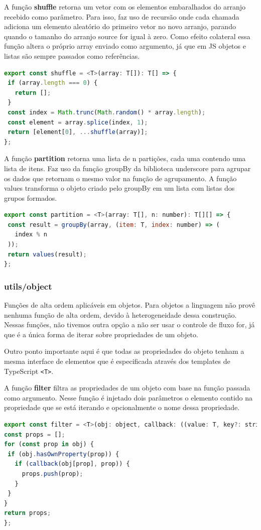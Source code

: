 \documentclass[rel_mlp]{iiufrgs}
\begin{document}
A função \textbf{shuffle} retorna um vetor com os elementos embaralhados do arranjo recebido como parâmetro. Para isso, faz uso de recursão onde cada chamada adiciona um elemento aleatório do primeiro vetor no novo arranjo, parando quando o tamanho do arranjo source for igual à zero. Como efeito colateral essa função altera o próprio array enviado como argumento, já que em JS objetos e listas são sempre passados como referências.
\begin{lstlisting}[language = JavaScript]
export const shuffle = <T>(array: T[]): T[] => {
 if (array.length === 0) {
   return [];
 }
 const index = Math.trunc(Math.random() * array.length);
 const element = array.splice(index, 1);
 return [element[0], ...shuffle(array)];
};
\end{lstlisting}

A função \textbf{partition} retorna uma lista de n partições, cada uma contendo uma lista de itens. Faz uso da função groupBy da biblioteca underscore para agrupar os dados que retornam o mesmo valor na função de agrupamento. A função values transforma o objeto criado pelo groupBy em um lista com listas dos grupos formados.
\begin{lstlisting}[language = JavaScript]
export const partition = <T>(array: T[], n: number): T[][] => {
 const result = groupBy(array, (item: T, index: number) => (
   index % n
 ));
 return values(result);
};
\end{lstlisting}

\subsubsection{utils/object}
Funções de alta ordem aplicáveis em objetos. Para objetos a linguagem não provê nenhuma função de alta ordem, devido à heterogeneidade dessa construção. Nessas funções, não tivemos outra opção a não ser usar o controle de fluxo for, já que é a única forma de iterar sobre propriedades de um objeto. \par Outro ponto importante aqui é que todas as propriedades do objeto tenham a mesma interface de elementos que é especificada através dos templates de TypeScript \verb|<T>|.

A função \textbf{filter} filtra as propriedades de um objeto com base na função passada como argumento. Nesse função é injetado dois parâmetros o elemento contido na propriedade que se está iterando e opcionalmente o nome dessa propriedade.

\begin{lstlisting}[language=JavaScript]
export const filter = <T>(obj: object, callback: ((value: T, key?: string) => boolean)): string[] => {
const props = [];
for (const prop in obj) {
 if (obj.hasOwnProperty(prop)) {
   if (callback(obj[prop], prop)) {
     props.push(prop);
   }
 }
}
return props;
};
\end{lstlisting}
\end{document}
